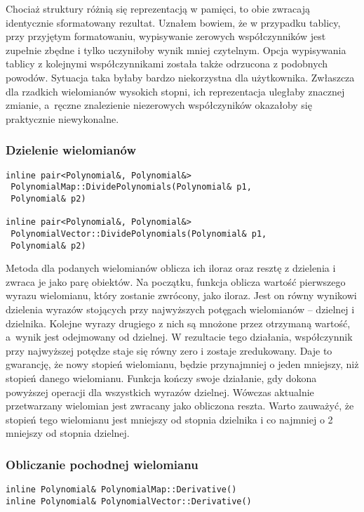 Chociaż struktury różnią się reprezentacją w pamięci, to obie zwracają identycznie sformatowany rezultat. Uznałem bowiem, że w przypadku tablicy, przy przyjętym formatowaniu, wypisywanie zerowych współczynników jest zupełnie zbędne i tylko uczyniłoby wynik mniej czytelnym. Opcja wypisywania tablicy z kolejnymi współczynnikami została także odrzucona z podobnych powodów. Sytuacja taka byłaby bardzo niekorzystna dla użytkownika. Zwłaszcza dla rzadkich wielomianów wysokich stopni, ich reprezentacja uległaby znacznej zmianie, a~ręczne znalezienie niezerowych współczyników okazałoby się praktycznie niewykonalne.

\subsubsection{Dzielenie wielomianów}
\begin{lstlisting}
inline pair<Polynomial&, Polynomial&>
 PolynomialMap::DividePolynomials(Polynomial& p1,
 Polynomial& p2)

inline pair<Polynomial&, Polynomial&>
 PolynomialVector::DividePolynomials(Polynomial& p1,
 Polynomial& p2)
\end{lstlisting}

Metoda dla podanych wielomianów oblicza ich iloraz oraz resztę z dzielenia i zwraca je jako parę obiektów. Na początku, funkcja oblicza wartość pierwszego wyrazu wielomianu, który zostanie zwrócony, jako iloraz. Jest on równy wynikowi dzielenia wyrazów stojących przy najwyższych potęgach wielomianów – dzielnej i dzielnika. Kolejne wyrazy drugiego z nich są mnożone przez otrzymaną wartość, a~wynik jest odejmowany od dzielnej. W rezultacie tego działania, współczynnik przy najwyższej potędze staje się równy zero i zostaje zredukowany. Daje to gwarancję, że nowy stopień wielomianu, będzie przynajmniej o jeden mniejszy, niż stopień danego wielomianu. Funkcja kończy swoje działanie, gdy dokona powyższej operacji dla wszystkich wyrazów dzielnej. Wówczas aktualnie przetwarzany wielomian jest zwracany jako obliczona reszta. Warto zauważyć, że stopień tego wielomianu jest mniejszy od stopnia dzielnika i co najmniej o 2 mniejszy od stopnia dzielnej.

\subsubsection{Obliczanie pochodnej wielomianu}
\begin{lstlisting}
inline Polynomial& PolynomialMap::Derivative()
inline Polynomial& PolynomialVector::Derivative()
\end{lstlisting}

